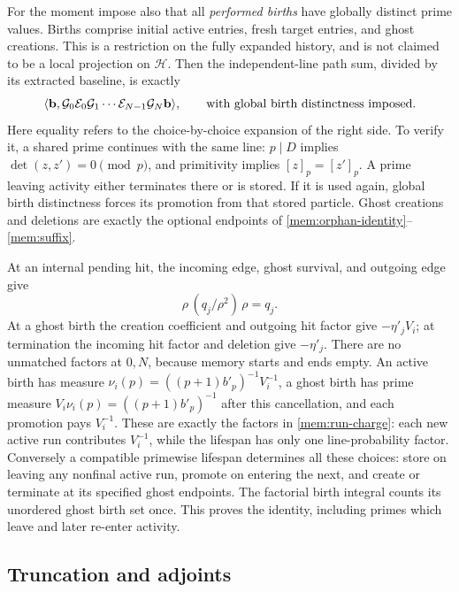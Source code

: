For the moment impose also that all \emph{performed births} have
globally distinct prime values. Births comprise initial active
entries, fresh target entries, and ghost creations. This is a
restriction on the fully expanded history, and is not claimed to be
a local projection on $\mathscr H$. Then the independent-line path sum,
divided by its extracted baseline, is exactly
\begin{equation}\label{mem:operator-history}
 \langle \mathbf b,\mathcal G_0\mathcal E_0\mathcal G_1\cdots
  \mathcal E_{N-1}\mathcal G_N\mathbf b\rangle,
 \qquad\text{with global birth distinctness imposed.}
\end{equation}
Here equality refers to the choice-by-choice expansion of the right
side. To verify it, a shared prime continues with the same line:
$p\mid D$ implies $\det(z,z')=0\pmod p$, and primitivity implies
$[z]_p=[z']_p$. A prime leaving activity either terminates there or is
stored. If it is used again, global birth distinctness forces its
promotion from that stored particle. Ghost creations and deletions
are exactly the optional endpoints of
\eqref{mem:orphan-identity}--\eqref{mem:suffix}.

At an internal pending hit, the incoming edge, ghost survival, and
outgoing edge give
\begin{equation}\label{mem:rho-cancellation}
 \rho\,(q_j/\rho^2)\,\rho=q_j.
\end{equation}
At a ghost birth the creation coefficient and outgoing hit factor
give $-\eta'_jV_i$; at termination the incoming hit factor and deletion
give $-\eta'_j$. There are no unmatched factors at $0,N$, because memory
starts and ends empty. An active birth has measure
$\nu_i(p)=((p+1)b'_p)^{-1}V_i^{-1}$, a ghost birth has prime measure
$V_i\nu_i(p)=((p+1)b'_p)^{-1}$ after this cancellation, and each
promotion pays $V_i^{-1}$. These are exactly the factors in
\eqref{mem:run-charge}: each new active run contributes $V_i^{-1}$,
while the lifespan has only one line-probability factor.
Conversely a compatible primewise lifespan determines all these
choices: store on leaving any nonfinal active run, promote on entering
the next, and create or terminate at its specified ghost endpoints.
The factorial birth integral counts its unordered ghost birth set
once. This proves the identity, including primes which leave and
later re-enter activity.

\subsection{Truncation and adjoints}

